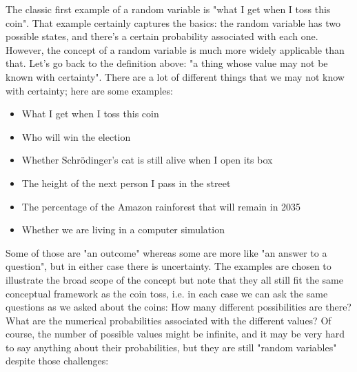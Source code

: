 The classic first example of a random variable is "what I get when I toss this coin". That example certainly captures the basics: the random variable has two possible states, and there's a certain probability associated with each one. However, the concept of a random variable is much more widely applicable than that. Let's go back to the definition above: "a thing whose value may not be known with certainty". There are a lot of different things that we may not know with certainty; here are some examples:
\begin{itemize}
\item What I get when I toss this coin
\item Who will win the election
\item Whether Schrödinger's cat is still alive when I open its box
\item The height of the next person I pass in the street
\item The percentage of the Amazon rainforest that will remain in 2035
\item Whether we are living in a computer simulation
\end{itemize}
Some of those are "an outcome" whereas some are more like "an answer to a question", but in either case there is uncertainty. The examples are chosen to illustrate the broad scope of the concept but note that they all still fit the same conceptual framework as the coin toss, i.e. in each case we can ask the same questions as we asked about the coins: How many different possibilities are there? What are the numerical probabilities associated with the different values? Of course, the number of possible values might be infinite, and it may be very hard to say anything about their probabilities, but they are still "random variables" despite those challenges:

